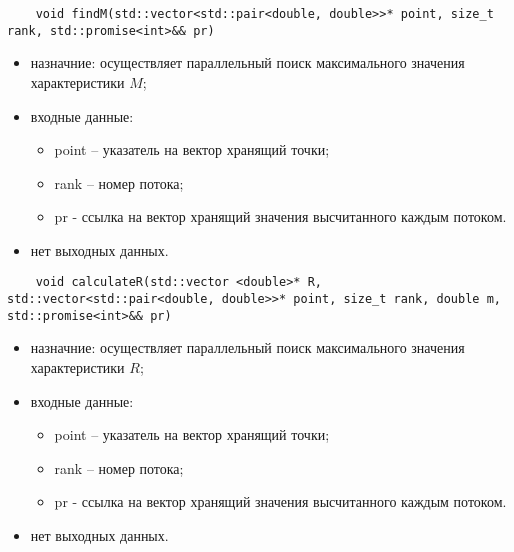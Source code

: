 \documentclass{report}
\begin{document}
\begin{lstlisting}
    void findM(std::vector<std::pair<double, double>>* point, size_t rank, std::promise<int>&& pr)
\end{lstlisting}
\begin{itemize}
    \item назначние: осуществляет параллельный поиск максимального значения характеристики $M$;
    \item входные данные:
        \begin{itemize}	
            \item point – указатель на вектор хранящий точки;
            \item rank – номер потока;
            \item pr - ссылка на вектор хранящий значения высчитанного каждым потоком.
        \end{itemize}
    \item нет выходных данных.
\end{itemize}

\begin{lstlisting}
    void calculateR(std::vector <double>* R, std::vector<std::pair<double, double>>* point, size_t rank, double m, std::promise<int>&& pr)
\end{lstlisting}
\begin{itemize}
    \item назначние: осуществляет параллельный поиск максимального значения характеристики $R$;
    \item входные данные:
        \begin{itemize}	
            \item point – указатель на вектор хранящий точки;
            \item rank – номер потока;
            \item pr - ссылка на вектор хранящий значения высчитанного каждым потоком.
        \end{itemize}
    \item нет выходных данных.
\end{itemize}
\end{document}
